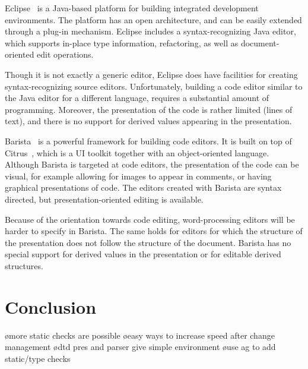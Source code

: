 \documentclass[12pt]{article}
\begin{document}


Eclipse~\cite{eclipse2001} is a Java-based platform for building integrated development environments. The platform has an open architecture, and can be easily extended through a plug-in mechanism. Eclipse includes a syntax-recognizing Java editor, which supports in-place type information, refactoring, as well as document-oriented edit operations. 

Though it is not exactly a generic editor, Eclipse does have facilities for creating syntax-recognizing source editors. Unfortunately, building a code editor similar to the Java editor for a different language, requires a substantial amount of programming. Moreover, the presentation of the code is rather limited (lines of text), and there is no support for derived values appearing in the presentation.


Barista~\cite{KoMyers06Barista} is a powerful framework for building code editors. It is built on top of Citrus~\cite{KoMyers05Citrus}, which is a UI toolkit together with an object-oriented language. Although Barista is targeted at code editors, the presentation of the code can be visual, for example allowing for images to appear in comments, or having graphical presentations of code. The editors created with Barista are syntax directed, but presentation-oriented editing is available. 

Because of the orientation towards code editing, word-processing editors will be harder to specify in Barista. The same holds for editors for which the structure of the presentation does not follow the structure of the document. Barista has no special support for derived values in the presentation or for editable derived structures.



%
\section{Conclusion} 
%

\bl
\o more static checks are possible
\o easy ways to increase speed after change management
\o dtd pres and parser give simple environment
\o use ag to add static/type checks
\el

%



\end{document}
